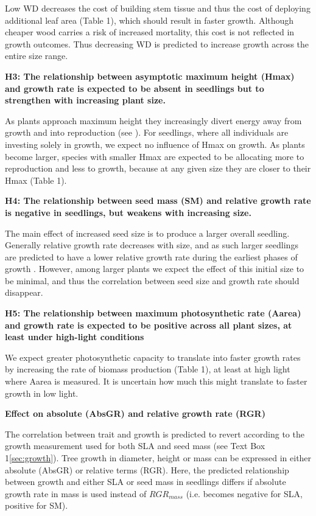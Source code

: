 \documentclass[a4paper]{article}\usepackage[]{graphicx}\usepackage[]{color}
\begin{document}
Low WD decreases the cost of building stem tissue and thus the cost of deploying additional leaf area (Table 1), which should result in faster growth. Although cheaper wood carries a risk of increased mortality, this cost is not reflected in growth outcomes. Thus decreasing WD is predicted to increase growth across the entire size range. 

\textbf{H3: The relationship between asymptotic maximum height (Hmax) and growth rate is expected to be absent in seedlings but to strengthen with increasing plant size.}

As plants approach maximum height they increasingly divert energy away from growth and into reproduction (see \citealt{Thomas:1996do, Falster:2011ii, Wenk:2014jz}). For seedlings, where all individuals are investing solely in growth, we expect no influence of Hmax on growth. As plants become larger, species with smaller Hmax are expected to be allocating more to reproduction and less to growth, because at any given size they are closer to their Hmax (Table 1). 

\textbf{H4: The relationship between seed mass (SM) and relative growth rate is negative in seedlings, but weakens with increasing size.}

The main effect of increased seed size is to produce a larger overall seedling. Generally relative growth rate decreases with size, and as such larger seedlings are predicted to have a lower relative growth rate during the earliest phases of growth \citet{Turnbull:2012ew}. However, among larger plants we expect the effect of this initial size to be minimal, and thus the correlation between seed size and growth rate should disappear.

\textbf{H5: The relationship between maximum photosynthetic rate (Aarea) and growth rate is expected to be positive across all plant sizes, at least under high-light conditions}

We expect greater photosynthetic capacity to translate into faster growth rates by increasing the rate of biomass production (Table 1), at least at high light where Aarea is measured. It is uncertain how much this might translate to faster growth in low light.

\textbf{Effect on absolute (AbsGR) and relative growth rate (RGR)}  

The correlation between trait and growth is predicted to revert according to the growth measurement used for both SLA and seed mass (see Text Box 1\ref{sec:growth}). Tree growth in diameter, height or mass can be expressed in either absolute (AbsGR) or relative terms (RGR). Here, the predicted relationship between growth and either SLA or seed mass in seedlings differs if absolute growth rate in mass is used instead of $RGR_{mass}$ (i.e. becomes negative for SLA, positive for SM). 
\end{document}
